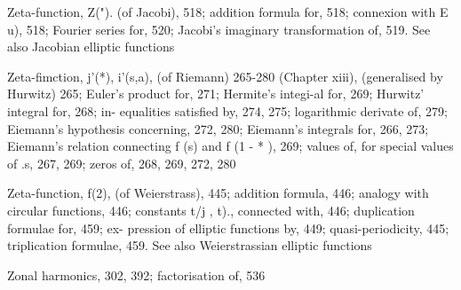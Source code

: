 Zeta-function, Z("). (of Jacobi), 518; addition formula for, 518; connexion with E u), 518;
Fourier series for, 520; Jacobi's imaginary transformation of, 519. See also Jacobian
elliptic functions

Zeta-fimction, j'(*), i'(s,a), (of Riemann) 265-280 (Chapter xiii), (generalised by Hurwitz) 265;
Euler's product for, 271; Hermite's integi-al for, 269; Hurwitz' integral for, 268; in-
equalities satisfied by, 274, 275; logarithmic derivate of, 279; Eiemann's hypothesis
concerning, 272, 280; Eiemann's integrals for, 266, 273; Eiemann's relation connecting f (s)
and f (1 - * ), 269; values of, for special values of .s, 267, 269; zeros of, 268, 269, 272, 280

Zeta-function, f(2), (of Weierstrass), 445; addition formula, 446; analogy with circular
functions, 446; constants t/j , t)., connected with, 446; duplication formulae for, 459; ex-
pression of elliptic functions by, 449; quasi-periodicity, 445; triplication formulae, 459.
See also Weierstrassian elliptic functions

Zonal harmonics, 302, 392; factorisation of, 536